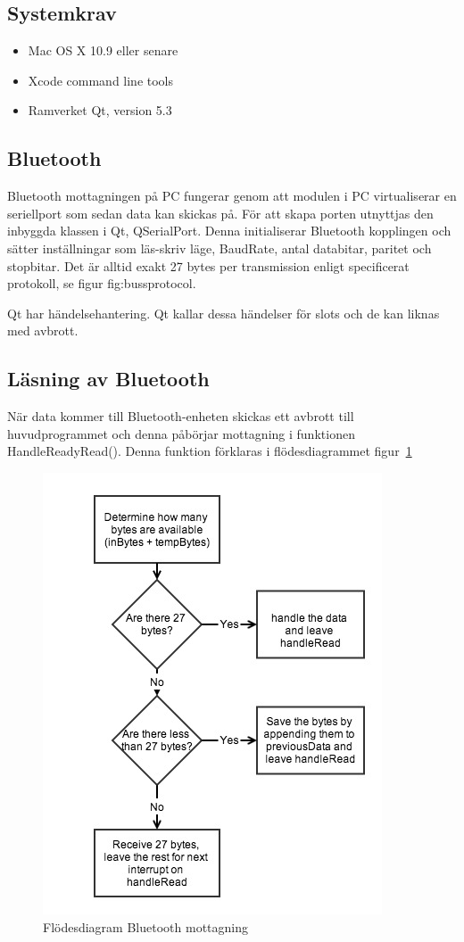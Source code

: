 \documentclass[a4paper,12pt,fleqn]{article}
\begin{document}
\subsection{Systemkrav}
\begin{itemize}
	\item Mac OS X 10.9 eller senare
	\item Xcode command line tools
	\item Ramverket Qt, version 5.3
\end{itemize}

\subsection{Bluetooth}
Bluetooth mottagningen på PC fungerar genom att modulen i PC virtualiserar en seriellport som sedan data kan skickas på. För att skapa porten utnyttjas den inbyggda klassen i Qt, QSerialPort. Denna initialiserar Bluetooth kopplingen och sätter inställningar som läs-skriv läge, BaudRate, antal databitar, paritet och stopbitar. Det är alltid exakt 27 bytes per transmission enligt specificerat protokoll, se figur {fig:bussprotocol}. 

Qt har händelsehantering. Qt kallar dessa händelser för slots och de kan liknas med avbrott.

\subsection{Läsning av Bluetooth}
När data kommer till Bluetooth-enheten skickas ett avbrott till huvudprogrammet och denna påbörjar mottagning i funktionen HandleReadyRead(). Denna funktion förklaras i flödesdiagrammet figur~\ref{fig:BTpc}

\begin{figure}[htp] %
  \begin{center}
  \includegraphics[keepaspectratio=true,width=0.6\linewidth]{bilder/bluetoothpc.jpg}  %
  \end{center}
  \caption{Flödesdiagram Bluetooth mottagning} %
  \label{fig:BTpc}
\end{figure}
\end{document}
